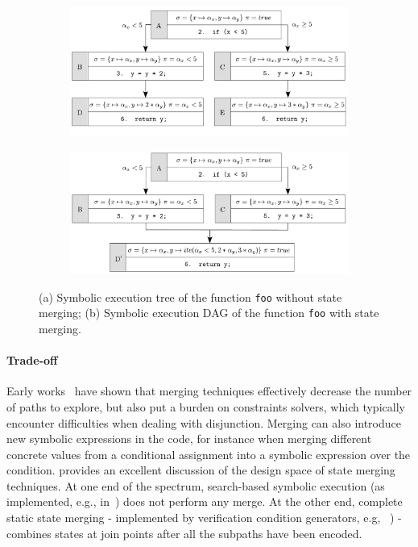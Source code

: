 \begin{figure}[t]
  \vspace{-3mm}
  \centering
  \begin{subfigure}{.5\textwidth}
    \centering
    \hspace{-5mm}
    \includegraphics[width=1.05\columnwidth]{images/state-merging} 
    \caption{}
  \end{subfigure}%
  \begin{subfigure}{.5\textwidth}
    \centering
    \includegraphics[width=1.05\columnwidth]{images/state-merging-2} 
    \caption{}
  \end{subfigure}
  \caption{(a) Symbolic execution tree of the function {\tt foo} without state merging; (b) Symbolic execution DAG of the function {\tt foo} with state merging.}
  \label{fig:example-state-merging}
\end{figure}


\paragraph{Trade-off} Early works~\cite{G-POPL07,HSS-RV09} have shown that merging techniques effectively decrease the number of paths to explore, but also put a burden on constraints solvers, which typically encounter difficulties when dealing with disjunction. Merging can also introduce new symbolic expressions in the code, for instance when merging different concrete values from a conditional assignment into a symbolic expression over the condition. \cite{KKB-PLDI12} provides an excellent discussion of the design space of state merging techniques. At one end of the spectrum, search-based symbolic execution (as implemented, e.g., in~\cite{KLEE-OSDI08}) does not perform any merge. At the other end, complete static state merging - implemented by verification condition generators, e.g, ~\cite{SATURN-POPL05,CALYSTO-ICSE08}) - combines states at join points after all the subpaths have been encoded.

